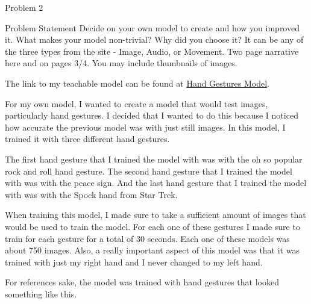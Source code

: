 \begin{problem}{Problem 2}
    \begin{statement}{Problem Statement}
        Decide on your own model to create and how you improved it. What makes your model non-trivial? Why did you choose it? It can be any of the three types from the site - Image, Audio, or Movement. 
        Two page narrative here and on pages 3/4. You may include thumbnails of images.
    \end{statement}

    \begin{Highlight}[Solution]
        \begin{spacing}{1.50}
            The link to my teachable model can be found at \href{https://teachablemachine.withgoogle.com/models/dkkzS5pWK/}{Hand Gestures Model}.

            For my own model, I wanted to create a model that would test images, particularly hand gestures. I decided that I wanted to do this because I noticed how accurate the previous model was
            with just still images. In this model, I trained it with three different hand gestures.

            The first hand gesture that I trained the model with was with the oh so popular rock and roll hand gesture. The second hand gesture that I trained the model with was with the peace sign.
            And the last hand gesture that I trained the model with was with the Spock hand from Star Trek. 

            When training this model, I made sure to take a sufficient amount of images that would be used to train the model. For each one of these gestures I made sure to train for each gesture for
            a total of 30 seconds. Each one of these models was about 750 images. Also, a really important aspect of this model was that it was trained with just my right hand and I never changed to
            my left hand.

            For references sake, the model was trained with hand gestures that looked something like this.
            

\end{spacing}
\end{Highlight}
\end{problem}
